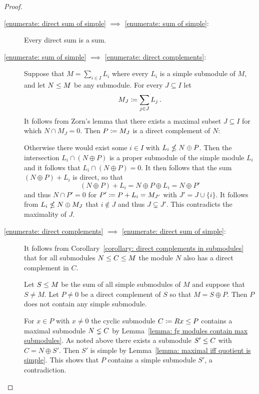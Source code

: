 \begin{proof}
  \leavevmode
  \begin{description}
    \item[\ref*{enumerate: direct sum of simple} $\implies$ \ref*{enumerate: sum of simple}:]
      Every direct sum is a sum.
    \item[\ref*{enumerate: sum of simple} $\implies$ \ref*{enumerate: direct complements}:]
      Suppose that $M = \sum_{i \in I} L_i$ where every $L_i$ is a simple submodule of $M$, and let $N \leq M$ be any submodule.
      For every $J \subseteq I$ let
      \[
                  M_J
        \coloneqq  \sum_{j \in J} L_j \,.
      \]
      It follows from Zorn’s lemma that there exists a maximal subset $J \subseteq I$ for which $N \cap M_J = 0$.
      Then $P \coloneqq M_J$ is a direct complement of $N$:
      
      Otherwise there would exist some $i \in I$ with $L_i \nleq N \oplus P$.
      Then the intersection $L_i \cap (N \oplus P)$ is a proper submodule of the simple module $L_i$ and it follows that $L_i \cap (N \oplus P) = 0$.
      It then follows that the sum $(N \oplus P) + L_i$ is direct, so that
      \[
          (N \oplus P) + L_i
        = N \oplus P \oplus L_i
        = N \oplus P'
      \]
      and thus $N \cap P' = 0$ for $P' \coloneqq P + L_i = M_{J'}$ with $J' = J \cup \{i\}$.
      It follows from $L_i \nleq N \oplus M_J$ that $i \notin J$ and thus $J \subsetneq J'$.
      This contradicts the maximality of $J$.
    \item[\ref*{enumerate: direct complements} $\implies$ \ref*{enumerate: direct sum of simple}:]
      It follows from Corollary~\ref{corollary: direct complements in submodules} that for all submodules $N \leq C \leq M$ the module $N$ also has a direct complement in $C$.
      
      Let $S \leq M$ be the sum of all simple submodules of $M$ and suppose that $S \neq M$.
      Let $P \neq 0$ be a direct complement of $S$ so that $M = S \oplus P$.
      Then $P$ does not contain any simple submodule.
      
      For $x \in P$ with $x \neq 0$ the cyclic submodule $C \coloneqq Rx \leq P$ contains a maximal submodule $N \lneq C$ by Lemma~\ref{lemma: fg modules contain max submodules}.
      As noted above there exists a submodule $S' \leq C$ with $C = N \oplus S'$.
      Then $S'$ is simple by Lemma~\ref{lemma: maximal iff quotient is simple}.
      This shows that $P$ contains a simple submodule $S'$, a contradiction.
    \qedhere
  \end{description}
\end{proof}


